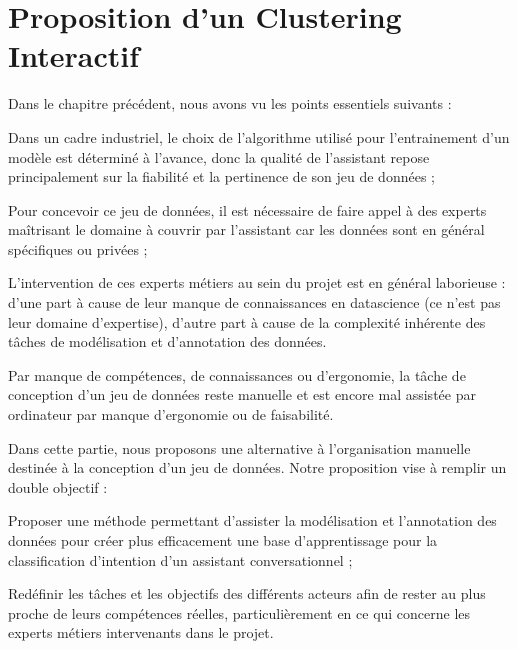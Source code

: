 \chapter{Proposition d'un Clustering Interactif}
    \label{chapter:2-CLUSTERING-INTERACTIF}
    
    Dans le chapitre précédent, nous avons vu les points essentiels suivants :
	\begin{todolist}
		\item[\itemok] Dans un cadre industriel, le choix de l'algorithme utilisé pour l'entrainement d'un modèle est déterminé à l'avance, donc la qualité de l'assistant repose principalement sur la fiabilité et la pertinence de son jeu de données ;
		\item[\itemok] Pour concevoir ce jeu de données, il est nécessaire de faire appel à des experts maîtrisant le domaine à couvrir par l'assistant car les données sont en général spécifiques ou privées ;
		\item[\itemok] L'intervention de ces experts métiers au sein du projet est en général laborieuse :
		d'une part à cause de leur manque de connaissances en datascience (ce n'est pas leur domaine d'expertise),
		d'autre part à cause de la complexité inhérente des tâches de modélisation et d'annotation des données.
	  \item[\itemok] Par manque de compétences, de connaissances ou d'ergonomie, la tâche de conception d'un jeu de données reste manuelle et est encore mal assistée par ordinateur par manque d'ergonomie ou de faisabilité.  %

	  
	\end{todolist}
	
	Dans cette partie, nous proposons une alternative à l'organisation manuelle destinée à la conception d'un jeu de données. Notre proposition vise à remplir un double objectif :
	\begin{todolist}
		\item Proposer une méthode permettant d'assister la modélisation et l'annotation des données pour créer plus efficacement une base d'apprentissage pour la classification d'intention d'un assistant conversationnel ;
		\item Redéfinir les tâches et les objectifs des différents acteurs afin de rester au plus proche de leurs compétences réelles, particulièrement en ce qui concerne les experts métiers intervenants dans le projet.
	\end{todolist}

